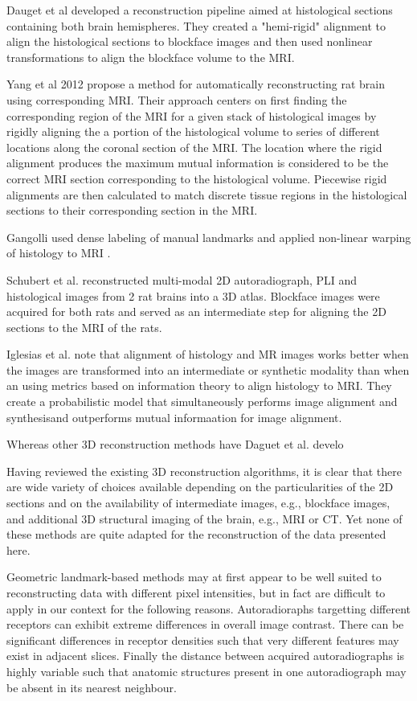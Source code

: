 \documentclass[12pt]{article}
\begin{document}
Dauget et al \cite{Dauget2007} developed a reconstruction pipeline aimed at histological sections containing both brain hemispheres. They created a "hemi-rigid" alignment to align the histological sections to blockface images and then used nonlinear transformations to align the blockface volume to the MRI. 

Yang et al 2012 \cite{Yang2012} propose a method for automatically reconstructing rat brain using corresponding MRI. Their approach centers on first finding the corresponding region of the MRI for a given stack of histological images by rigidly aligning the a portion of the histological volume to series of different locations along the coronal section of the MRI. The location where the rigid alignment produces the maximum mutual information is considered to be the correct MRI section corresponding to the histological volume. Piecewise rigid alignments are then calculated to match discrete tissue regions in the histological sections to their corresponding section in the MRI. 

Gangolli used dense labeling of manual landmarks and applied non-linear warping of histology to MRI \cite{Gangolli2017}.

Schubert et al. \cite{Schubert2018} reconstructed multi-modal 2D autoradiograph, PLI and histological images from 2 rat brains into a 3D atlas. Blockface images were acquired for both rats and served as an intermediate step for aligning the 2D sections to the MRI of the rats. 

Iglesias et al. \cite{Iglesias2018} note that alignment of histology and MR images works better when the images are transformed into an intermediate or synthetic modality than when an using metrics based on information theory to align histology to MRI. They create a probabilistic model that simultaneously performs image alignment and synthesisand outperforms mutual informaation for image alignment. 

Whereas other 3D reconstruction methods have Daguet et al. develo

Having reviewed the existing 3D reconstruction algorithms, it is clear that there are wide variety of choices available depending on the particularities of the 2D sections and on the availability of intermediate images, e.g., blockface images, and additional 3D structural imaging of the brain, e.g., MRI or CT. Yet none of these methods are quite adapted for the reconstruction of the data presented here.

Geometric landmark-based methods may at first appear to be well suited to reconstructing data with different pixel intensities, but in fact are difficult to apply in our context for the following reasons. Autoradioraphs targetting different receptors can exhibit extreme differences in overall image contrast. There can be significant differences in receptor densities such that very different features may exist in adjacent slices. Finally the distance between acquired autoradiographs is highly variable such that anatomic structures present in one autoradiograph may be absent in its nearest neighbour.
\end{document}
